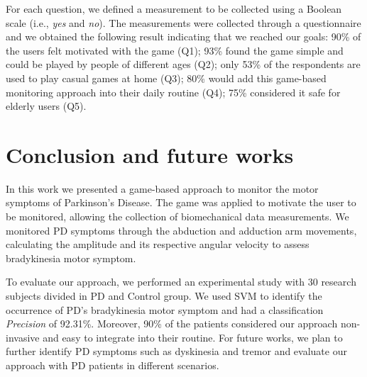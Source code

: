 \documentclass[10pt, conference, compsocconf]{IEEEtran}
\begin{document}
For each question, we defined a measurement to be collected using a Boolean scale (i.e., \emph{yes} and \emph{no}). The measurements were collected through a questionnaire and we obtained the following result indicating that we reached our goals: 90\% of the users felt motivated with the game (Q1); 93\% found the game simple and could be played by people of different ages (Q2); only 53\% of the respondents are used to play casual games at home (Q3); 80\% would add this game-based monitoring approach into their daily routine (Q4); 75\% considered it safe for elderly users (Q5).


\section{Conclusion and future works}
\label{conclusion}

In this work we presented a game-based approach to monitor the motor symptoms of Parkinson's Disease. The game was applied to motivate the user to be monitored, allowing the collection of biomechanical data measurements. We monitored PD symptoms through the abduction and adduction arm movements, calculating the amplitude and its respective angular velocity to assess bradykinesia motor symptom. 


To evaluate our approach, we performed an experimental study with 30 research subjects divided in PD and Control group. We used SVM to identify the occurrence of PD's bradykinesia motor symptom and had a classification \textit{Precision} of 92.31\%. Moreover, 90\% of the patients considered our approach non-invasive and easy to integrate into their routine. For future works, we plan to further identify PD symptoms such as dyskinesia and tremor and evaluate our approach with PD patients in different scenarios.

\end{document}
